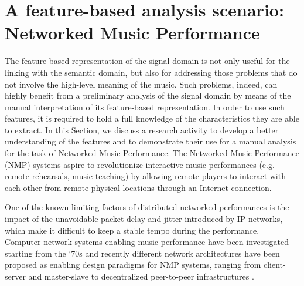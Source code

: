 \vspace{3cm}
\section{A feature-based analysis scenario: Networked Music Performance}
\label{sec:NMP}
 
The feature-based representation of the signal domain is not only useful for the linking with the semantic domain, but also for addressing those problems that do not involve the high-level meaning of the music. Such problems, indeed, can highly benefit from a preliminary analysis of the signal domain by means of the manual interpretation of its feature-based representation. In order to use such features, it is required to hold a full knowledge of the characteristics they are able to extract. In this Section, we discuss a research activity to develop a better understanding of the features and to demonstrate their use for a manual analysis for the task of Networked Music Performance. The Networked Music Performance (NMP) systems aspire to revolutionize interactive music performances (e.g. remote rehearsals, music teaching) by allowing remote players to interact with each other from remote physical locations through an Internet connection. 

One  of the known limiting factors of distributed networked performances is the impact of the unavoidable packet delay and jitter introduced by IP networks, which make it difficult to keep a stable tempo during the performance. Computer-network systems enabling music performance have been investigated starting from the \lq 70s \cite{barbosa2003displaced} and recently different network architectures have been proposed as enabling design paradigms for NMP systems, ranging from client-server \cite{saputra2012design,gu2005network} and master-slave \cite{renwick2012sourcenode} to decentralized peer-to-peer infrastructures \cite{stais2013networked,chafe2011living}. 


